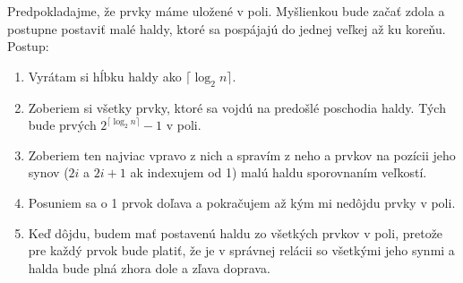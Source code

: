
Predpokladajme, že prvky máme uložené v poli. Myšlienkou bude začať 
zdola a postupne postaviť malé haldy, ktoré sa pospájajú do jednej 
veľkej až ku koreňu. Postup:
\begin{enumerate}
    \item Vyrátam si hĺbku haldy ako $\lceil\log_2 n\rceil$.
    \item Zoberiem si všetky prvky, ktoré sa vojdú na predošlé poschodia 
    haldy. Tých bude prvých $2^{\lceil\log_2 n\rceil}-1$ v poli.
    \item Zoberiem ten najviac vpravo z nich a spravím z neho a prvkov 
    na pozícii jeho synov ($2i$ a $2i+1$ ak indexujem od 1) malú haldu 
    sporovnaním veľkostí.
    \item Posuniem sa o 1 prvok doľava a pokračujem až kým mi nedôjdu 
    prvky v poli.
    \item Keď dôjdu, budem mať postavenú haldu zo všetkých prvkov 
    v poli, pretože pre každý prvok bude platiť, že je v správnej 
    relácii so všetkými jeho synmi a halda bude plná zhora dole a 
    zľava doprava.
\end{enumerate}

